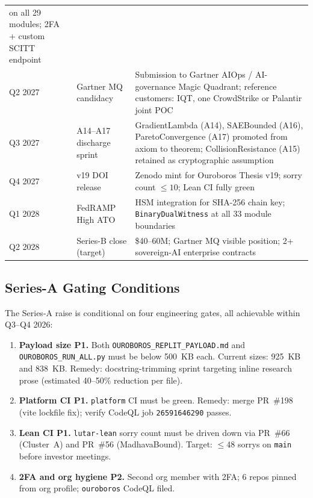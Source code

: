 \begin{table}[ht]
\begin{tabular}{lp{3.2cm}p{6.5cm}}
    on all 29 modules; 2FA + custom SCITT endpoint \\
Q2 2027 & Gartner MQ candidacy~\cite{gartner2025aiops}
  & Submission to Gartner AIOps / AI-governance Magic Quadrant;
    reference customers: IQT, one CrowdStrike or Palantir joint POC \\
Q3 2027 & A14--A17 discharge sprint
  & GradientLambda (A14), SAEBounded (A16), ParetoConvergence (A17)
    promoted from axiom to theorem; CollisionResistance (A15) retained
    as cryptographic assumption \\
Q4 2027 & v19 DOI release
  & Zenodo mint for Ouroboros Thesis v19; sorry count \(\leq 10\);
    Lean CI fully green \\
Q1 2028 & FedRAMP High ATO
  & HSM integration for SHA-256 chain key;
    \texttt{BinaryDualWitness} at all 33 module boundaries \\
Q2 2028 & Series-B close (target)
  & \$40--60M; Gartner MQ visible position; 2+ sovereign-AI
    enterprise contracts \\
\hline
\end{tabular}
\end{table}

\subsection{Series-A Gating Conditions}

The Series-A raise is conditional on four engineering gates, all
achievable within Q3--Q4 2026:

\begin{enumerate}
  \item \textbf{Payload size P1.}  Both
    \texttt{OUROBOROS\_REPLIT\_PAYLOAD.md} and \texttt{OUROBOROS\_RUN\_ALL.py}
    must be below 500~KB each.  Current sizes: 925~KB and 838~KB.
    Remedy: docstring-trimming sprint targeting
    inline research prose (estimated 40--50\% reduction per file).
  \item \textbf{Platform CI P1.}  \texttt{platform} CI must be green.
    Remedy: merge PR~\#198 (vite lockfile fix); verify CodeQL job
    \texttt{26591646290} passes.
  \item \textbf{Lean CI P1.}  \texttt{lutar-lean} sorry count must be
    driven down via PR~\#66 (Cluster~A) and PR~\#56 (MadhavaBound).
    Target: \(\leq 48\) sorrys on \texttt{main} before investor meetings.
  \item \textbf{2FA and org hygiene P2.}  Second org member with 2FA;
    6 repos pinned from org profile; \texttt{ouroboros} CodeQL filed.
\end{enumerate}

